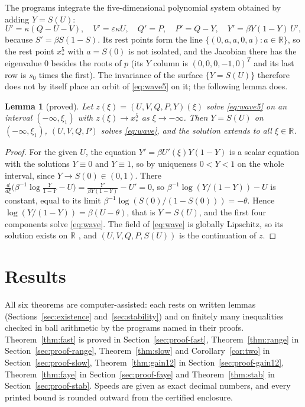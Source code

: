 \documentclass[11pt]{article}
\newtheorem{lemma}{Lemma}[section]
\theoremstyle{definition}
\newcommand{\R}{\mathbb{R}}
\newcommand{\eps}{\varepsilon}
\newcommand{\xs}{x_*}
\begin{document}
The programs integrate the five-dimensional polynomial system obtained by adding $Y = S(U)$:
\begin{equation}\label{eq:wave5}
  U' = \kappa(Q - U - V), \quad V' = \eps\kappa U, \quad Q' = P, \quad P' = Q - Y, \quad Y' = \beta Y(1 - Y)\, U',
\end{equation}
because $S' = \beta S(1 - S)$. Its rest points form the line $\{(0, a, a, 0, a) : a \in \R\}$, so the rest point $\xs^5$ with $a = S(0)$ is not isolated, and the Jacobian there has the eigenvalue $0$ besides the roots of $p$ (its $Y$ column is $(0, 0, 0, -1, 0)^T$ and its last row is $s_0$ times the first). The invariance of the surface $\{Y = S(U)\}$ therefore does not by itself place an orbit of \eqref{eq:wave5} on it; the following lemma does.

\begin{lemma}[proved]\label{lem:surface}
Let $z(\xi) = (U, V, Q, P, Y)(\xi)$ solve \eqref{eq:wave5} on an interval $(-\infty, \xi_1)$ with $z(\xi) \to \xs^5$ as $\xi \to -\infty$. Then $Y = S(U)$ on $(-\infty, \xi_1)$, $(U, V, Q, P)$ solves \eqref{eq:wave}, and the solution extends to all $\xi \in \R$.
\end{lemma}

\begin{proof}
For the given $U$, the equation $Y' = \beta U'(\xi) Y(1 - Y)$ is a scalar equation with the solutions $Y \equiv 0$ and $Y \equiv 1$, so by uniqueness $0 < Y < 1$ on the whole interval, since $Y \to S(0) \in (0, 1)$. There $\frac{d}{d\xi}\bigl(\beta^{-1}\log\frac{Y}{1 - Y} - U\bigr) = \frac{Y'}{\beta Y(1 - Y)} - U' = 0$, so $\beta^{-1}\log(Y/(1 - Y)) - U$ is constant, equal to its limit $\beta^{-1}\log(S(0)/(1 - S(0))) = -\theta$. Hence $\log(Y/(1 - Y)) = \beta(U - \theta)$, that is $Y = S(U)$, and the first four components solve \eqref{eq:wave}. The field of \eqref{eq:wave} is globally Lipschitz, so its solution exists on $\R$ \cite[Theorem~2.17]{teschl2012}, and $(U, V, Q, P, S(U))$ is the continuation of $z$.
\end{proof}

\section{Results}\label{sec:results}

All six theorems are computer-assisted: each rests on written lemmas (Sections~\ref{sec:existence} and~\ref{sec:stability}) and on finitely many inequalities checked in ball arithmetic by the programs named in their proofs. Theorem~\ref{thm:fast} is proved in Section~\ref{sec:proof-fast}, Theorem~\ref{thm:range} in Section~\ref{sec:proof-range}, Theorem~\ref{thm:slow} and Corollary~\ref{cor:two} in Section~\ref{sec:proof-slow}, Theorem~\ref{thm:gain12} in Section~\ref{sec:proof-gain12}, Theorem~\ref{thm:faye} in Section~\ref{sec:proof-faye} and Theorem~\ref{thm:stab} in Section~\ref{sec:proof-stab}. Speeds are given as exact decimal numbers, and every printed bound is rounded outward from the certified enclosure.
\end{document}
